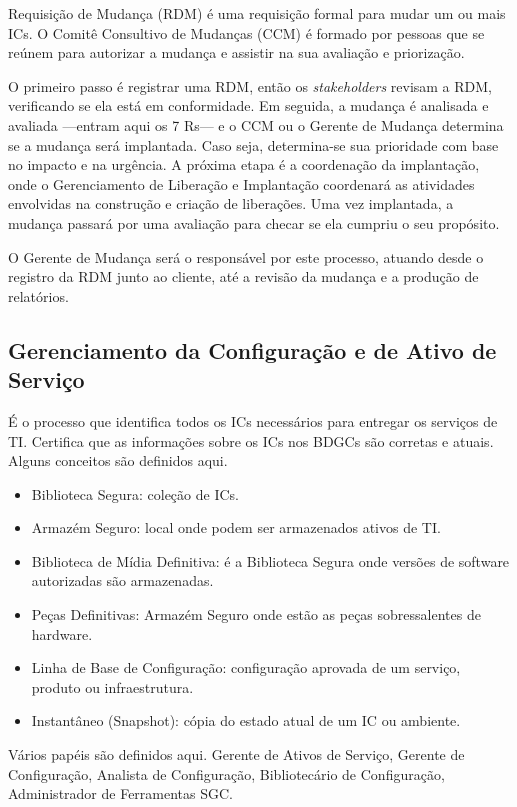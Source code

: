 Requisição de Mudança (RDM) é uma requisição formal para mudar um ou mais ICs.
O Comitê Consultivo de Mudanças (CCM) é formado por pessoas que se reúnem para
autorizar a mudança e assistir na sua avaliação e priorização.

O primeiro passo é registrar uma RDM, então os \emph{stakeholders} revisam a
RDM, verificando se ela está em conformidade. Em seguida, a mudança é analisada
e avaliada ---entram aqui os 7 Rs--- e o CCM ou o Gerente de Mudança determina
se a mudança será implantada. Caso seja, determina-se sua prioridade com base
no impacto e na urgência. A próxima etapa é a coordenação da implantação, onde
o Gerenciamento de Liberação e Implantação coordenará as atividades envolvidas
na construção e criação de liberações. Uma vez implantada, a mudança passará
por uma avaliação para checar se ela cumpriu o seu propósito.

O Gerente de Mudança será o responsável por este processo, atuando desde o
registro da RDM junto ao cliente, até a revisão da mudança e a produção de
relatórios.


\subsection{Gerenciamento da Configuração e de Ativo de Serviço}
É o processo que identifica todos os ICs necessários para entregar os serviços
de TI. Certifica que as informações sobre os ICs nos BDGCs são corretas e
atuais. Alguns conceitos são definidos aqui.
\begin{itemize}
	\item Biblioteca Segura: coleção de ICs.
	\item Armazém Seguro: local onde podem ser armazenados ativos de TI.
    \item Biblioteca de Mídia Definitiva: é a Biblioteca Segura onde versões de
        software autorizadas são armazenadas.
    \item Peças Definitivas: Armazém Seguro onde estão as peças sobressalentes
        de hardware.
    \item Linha de Base de Configuração: configuração aprovada de um serviço,
        produto ou infraestrutura.
	\item Instantâneo (Snapshot): cópia do estado atual de um IC ou ambiente.
\end{itemize}

Vários papéis são definidos aqui. Gerente de Ativos de Serviço, Gerente de
Configuração, Analista de Configuração, Bibliotecário de Configuração,
Administrador de Ferramentas SGC.


